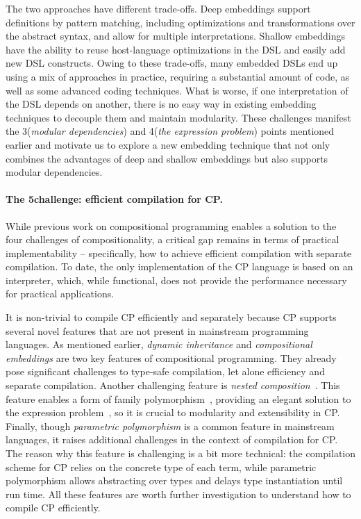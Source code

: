 The two approaches have different trade-offs. Deep embeddings support
definitions by pattern matching, including optimizations and transformations
over the abstract syntax, and allow for multiple interpretations. Shallow
embeddings have the ability to reuse host-language optimizations in the DSL and
easily add new DSL constructs. Owing to these trade-offs, many embedded DSLs end
up using a mix of approaches in practice, requiring a substantial amount of
code, as well as some advanced coding techniques. What is worse, if one
interpretation of the DSL depends on another, there is no easy way in existing
embedding techniques to decouple them and maintain modularity. These challenges
manifest the 3\rd (\emph{modular dependencies}) and 4\th (\emph{the expression
problem}) points mentioned earlier and motivate us to explore a new embedding
technique that not only combines the advantages of deep and shallow embeddings
but also supports modular dependencies.

\paragraph{The 5\th challenge: efficient compilation for CP.}
While previous work on compositional programming enables a solution to the four
challenges of compositionality, a critical gap remains in terms of practical
implementability -- specifically, how to achieve efficient compilation with
separate compilation. To date, the only implementation of the CP language is
based on an interpreter, which, while functional, does not provide the
performance necessary for practical applications.

It is non-trivial to compile CP efficiently and separately because CP supports
several novel features that are not present in mainstream programming languages.
As mentioned earlier, \emph{dynamic inheritance} and \emph{compositional
embeddings} are two key features of compositional programming. They already pose
significant challenges to type-safe compilation, let alone efficiency and
separate compilation. Another challenging feature is \emph{nested
composition}~\citep{bi2018essence}. This feature enables a form of family
polymorphism~\citep{ernst2001family}, providing an elegant solution to the
expression problem~\citep{ernst2004expression}, so it is crucial to modularity
and extensibility in CP. Finally, though \emph{parametric polymorphism} is a
common feature in mainstream languages, it raises additional challenges in the
context of compilation for CP. The reason why this feature is challenging is a
bit more technical: the compilation scheme for CP relies on the concrete type of
each term, while parametric polymorphism allows abstracting over types and
delays type instantiation until run time. All these features are worth further
investigation to understand how to compile CP efficiently.

